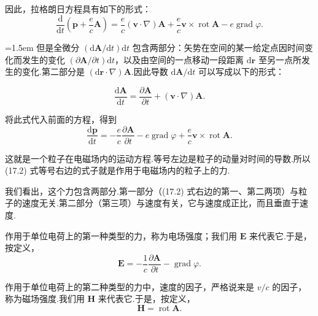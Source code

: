 因此，拉格朗日方程具有如下的形式：
\begin{equation*}
  \frac{\mathrm{d}}{\mathrm{d}t}\left(\boldsymbol{p}+\frac{e}{c}\boldsymbol{A}\right)
  =\frac{e}{c}\left(\boldsymbol{v}\cdot\nabla\right)\boldsymbol{A}
  +\frac{e}{c}\boldsymbol{v}\times\operatorname{rot}\boldsymbol{A}
  -e\operatorname{grad}\varphi.
\end{equation*}

{\emergencystretch=1.5em
但是全微分 $(\mathrm{d}\boldsymbol{A}/\mathrm{d}t)\mathrm{d}t$ 包含两部分：矢势在空间的某一给定点因时间变化而发生的变化
$(\partial\boldsymbol{A}/\partial t)\mathrm{d}t$，以及由空间的一点移动一段距离
$\mathrm{d}\boldsymbol{r}$ 至另一点所发生的变化.第二部分是
$(\mathrm{d}\boldsymbol{r}\cdot\nabla)\boldsymbol{A}$.因此导数
$\mathrm{d}\boldsymbol{A}/\mathrm{d}t$ 可以写成以下的形式：
\par}
\begin{equation*}
  \frac{\mathrm{d}\boldsymbol{A}}{\mathrm{d}t}
  =\frac{\partial\boldsymbol{A}}{\partial t}
  +\left(\boldsymbol{v}\cdot\nabla\right)\boldsymbol{A}.
\end{equation*}

将此式代入前面的方程，得到
\begin{equation}
  \frac{\mathrm{d}\boldsymbol{p}}{\mathrm{d}t}
  =-\frac{e}{c}\frac{\partial\boldsymbol{A}}{\partial t}
  -e\operatorname{grad}\varphi
  +\frac{e}{c}\boldsymbol{v}\times\operatorname{rot}\boldsymbol{A}.
\end{equation}

这就是一个粒子在电磁场内的运动方程.等号左边是粒子的动量对时间的导数.所以 (17.2) 式等号右边的式子就是作用于电磁场内的粒子上的力.

我们看出，这个力包含两部分.第一部分（(17.2) 式右边的第一、第二两项）与粒子的速度无关.第二部分（第三项）与速度有关，它与速度成正比，而且垂直于速度.

作用于单位电荷上的第一种类型的力，称为电场强度；我们用 $\boldsymbol{E}$ 来代表它.于是，按定义，
\begin{equation}
  \boldsymbol{E}=-\frac{1}{c}\frac{\partial\boldsymbol{A}}{\partial t}
  -\operatorname{grad}\varphi.
\end{equation}

作用于单位电荷上的第二种类型的力中，速度的因子，严格说来是 $v/c$ 的因子，称为磁场强度.我们用 $\boldsymbol{H}$ 来代表它.于是，按定义，
\begin{equation}
  \boldsymbol{H}=\operatorname{rot}\boldsymbol{A}.
\end{equation}

